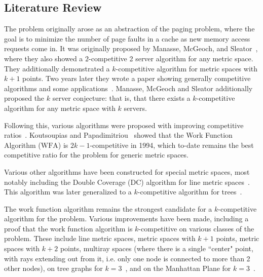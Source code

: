 \subsection{Literature Review}

The \KS problem originally arose as an abstraction of the paging problem, where the goal is to minimize the number of page faults in a cache as new memory access requests come in. It was originally proposed by Manasse, McGeoch, and Sleator~\cite{KS1988}, where they also showed a $2$-competitive 2 server algorithm for any metric space. They additionally demonstrated a $k$-competitive algorithm for metric spaces with $k+1$ points. Two years later they wrote a paper showing generally competitive algorithms and some applications~\cite{KS1990}. Manasse, McGeoch and Sleator additionally proposed the $k$ server conjecture: that is, that there exists a $k$-competitive algorithm for any metric space with $k$ servers. 

Following this, various algorithms were proposed with improving competitive ratios~\cite{KS1990, harm2000}. Koutsoupias and Papadimitriou~\cite{KS1990} showed that the Work Function Algorithm ($\mathrm{WFA}$) is $2k-1$-competitive in 1994, which to-date remains the best competitive ratio for the \KS problem for generic metric spaces.

Various other algorithms have been constructed for special metric spaces, most notably including the Double Coverage ($\mathrm{DC}$) algorithm for line metric spaces~\cite{new1991}. This algorithm was later generalized to a $k$-competitive algorithm for trees~\cite{tree1991}.

The work function algorithm remains the strongest candidate for a $k$-competitive algorithm for the \KS problem. Various improvements have been made, including a proof that the work function algorithm is $k$-competitive on various classes of the problem. These include line metric spaces, metric spaces with $k+1$ points, metric spaces with $k+2$ points, multiray spaces (where there is a single ``center" point, with rays extending out from it, i.e. only one node is connected to more than 2 other nodes), on tree graphs for $k=3$~\cite{unifyingPotential2021}, and on the Manhattan Plane for $k=3$~\cite{MP2002}. 

